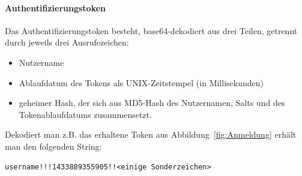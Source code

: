 \paragraph{Authentifizierungstoken}
Das Authentifizierungstoken besteht, base64-dekodiert aus drei Teilen, getrennt durch jeweils drei Ausrufezeichen:
\begin{itemize}
\item Nutzername
\item Ablaufdatum des Tokens als UNIX-Zeitstempel (in Millisekunden)
\item geheimer Hash, der sich aus MD5-Hash des Nutzernamen, Salts und des Tokenablaufdatums zusammensetzt.
\end{itemize}

Dekodiert man z.B.  das erhaltene Token aus Abbildung~\ref{fig:Anmeldung} erhält man den folgenden String:
\begin{lstlisting}
username!!!1433889355905!!<einige Sonderzeichen>
\end{lstlisting}
